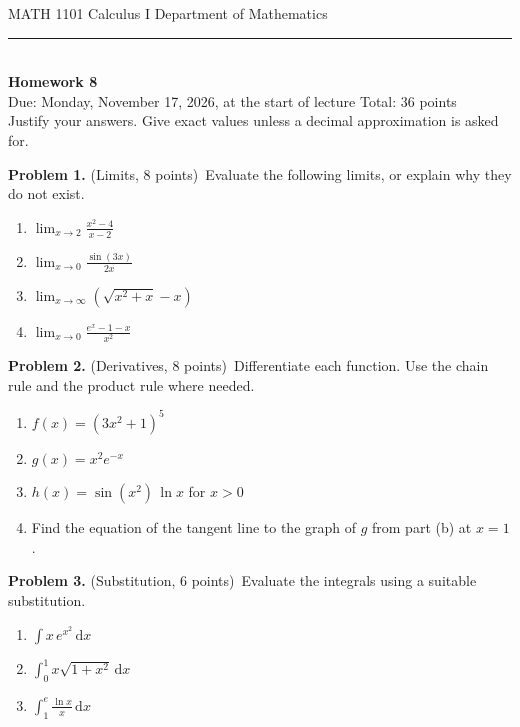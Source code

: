 \documentclass[11pt,a4paper]{article}
\newcommand{\problem}[3]{\bigskip\par\textbf{Problem #1.} (#2, #3 points)\ }
\newcommand{\dd}{\,\mathrm{d}}
\begin{document}
{\small MATH 1101 \textperiodcentered{} Calculus I \hfill Department of Mathematics}\\[-0.4em]
\rule{\linewidth}{0.6pt}\\[0.5em]
{\Large\bfseries Homework 8}\\[0.4em]
Due: Monday, November 17, 2026, at the start of lecture \hfill Total: 36 points\\[0.3em]
{\small Justify your answers. Give exact values unless a decimal approximation is asked for.}

\problem{1}{Limits}{8}Evaluate the following limits, or explain why they do not exist.
\begin{enumerate}
  \item $\displaystyle\lim_{x\to 2}\frac{x^2-4}{x-2}$
  \item $\displaystyle\lim_{x\to 0}\frac{\sin(3x)}{2x}$
  \item $\displaystyle\lim_{x\to\infty}\left(\sqrt{x^2+x}-x\right)$
  \item $\displaystyle\lim_{x\to 0}\frac{e^x-1-x}{x^2}$
\end{enumerate}

\problem{2}{Derivatives}{8}Differentiate each function. Use the chain rule and the product rule where needed.
\begin{enumerate}
  \item $f(x) = (3x^2+1)^5$
  \item $g(x) = x^2 e^{-x}$
  \item $h(x) = \sin(x^2)\,\ln x$ for $x>0$
  \item Find the equation of the tangent line to the graph of $g$ from part (b) at $x=1$.
\end{enumerate}

\problem{3}{Substitution}{6}Evaluate the integrals using a suitable substitution.
\begin{enumerate}
  \item $\displaystyle\int x\,e^{x^2}\dd x$
  \item $\displaystyle\int_0^1 x\sqrt{1+x^2}\dd x$
  \item $\displaystyle\int_1^e \frac{\ln x}{x}\dd x$
\end{enumerate}
\end{document}
